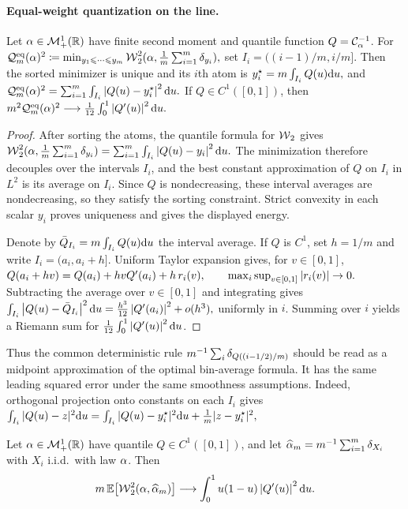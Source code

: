 \paragraph{Equal-weight quantization on the line.}
\begin{prop}\label{prop-1d-equal-weight-quantization}
Let $\alpha\in\mathcal{M}_+^1(\mathbb{R})$ have finite second moment and quantile function $Q=\mathcal{C}_{\alpha}^{-1}$. For
\(\mathcal{Q}^{\mathrm{eq}}_m(\alpha)^2 \coloneqq \min_{y_1\leqslant\cdots\leqslant y_m} \operatorname{\mathcal{W}}_2^2(\alpha,\frac1m\sum_{i=1}^m\delta_{y_i}),\)
set $I_i=((i-1)/m,i/m]$. Then the sorted minimizer is unique and its $i$th atom is \(y_i^\star = m\int_{I_i} Q(u)\mathrm{d} u,\)
and
\(\mathcal{Q}^{\mathrm{eq}}_m(\alpha)^2 = \sum_{i=1}^m \int_{I_i} \left\lvert Q(u)-y_i^\star\right\rvert^2\mathrm{d} u.\)
If $Q\in C^1([0,1])$, then
\(m^2\mathcal{Q}^{\mathrm{eq}}_m(\alpha)^2 \longrightarrow \frac1{12}\int_0^1\left\lvert Q'(u)\right\rvert^2\mathrm{d} u.\)
\end{prop}
\begin{proof}
After sorting the atoms, the quantile formula for $\operatorname{\mathcal{W}}_2$ gives \(\operatorname{\mathcal{W}}_2^2(\alpha,\frac1m\sum_{i=1}^m\delta_{y_i}) = \sum_{i=1}^m \int_{I_i}\left\lvert Q(u)-y_i\right\rvert^2\mathrm{d} u.\)
The minimization therefore decouples over the intervals $I_i$, and the best constant approximation of $Q$ on $I_i$ in $L^2$ is its average on $I_i$. Since $Q$ is nondecreasing, these interval averages are nondecreasing, so they satisfy the sorting constraint. Strict convexity in each scalar $y_i$ proves uniqueness and gives the displayed energy.

Denote by $\bar Q_{I_i}=m\int_{I_i}Q(u)\mathrm{d} u$ the interval average. If $Q$ is $C^1$, set $h=1/m$ and write $I_i=(a_i,a_i+h]$. Uniform Taylor expansion gives, for $v\in[0,1]$,
\(Q(a_i+hv)=Q(a_i)+hvQ'(a_i)+h\,r_i(v), \qquad \max_i\sup_{v\in[0,1]}\left\lvert r_i(v)\right\rvert\to0.\)
Subtracting the average over $v\in[0,1]$ and integrating gives \(\int_{I_i}\left\lvert Q(u)-\bar Q_{I_i}\right\rvert^2\mathrm{d} u = \frac{h^3}{12}\left\lvert Q'(a_i)\right\rvert^2+o(h^3),\)
uniformly in $i$. Summing over $i$ yields a Riemann sum for $\frac1{12}\int_0^1\left\lvert Q'(u)\right\rvert^2\mathrm{d} u$.
\end{proof}
Thus the common deterministic rule $m^{-1}\sum_i\delta_{Q((i-1/2)/m)}$ should be read as a midpoint approximation of the optimal bin-average formula. It has the same leading squared error under the same smoothness assumptions. Indeed, orthogonal projection onto constants on each $I_i$ gives
\(\int_{I_i}|Q(u)-z|^2\mathrm{d} u = \int_{I_i}|Q(u)-y_i^\star|^2\mathrm{d} u + \frac1m|z-y_i^\star|^2,\)
\begin{prop}\label{prop-1d-random-quantile-process}
Let $\alpha\in\mathcal{M}_+^1(\mathbb{R})$ have quantile $Q\in C^1([0,1])$, and let $\widehat{\alpha}_m=m^{-1}\sum_{i=1}^m\delta_{X_i}$ with $X_i$ i.i.d.\ with law $\alpha$. Then
\[
m\,\mathbb{E}\!\left[\operatorname{\mathcal{W}}_2^2(\alpha,\widehat{\alpha}_m)\right]
\longrightarrow
\int_0^1 u(1-u)\left\lvert Q'(u)\right\rvert^2\mathrm{d} u.
\]
\end{prop}
